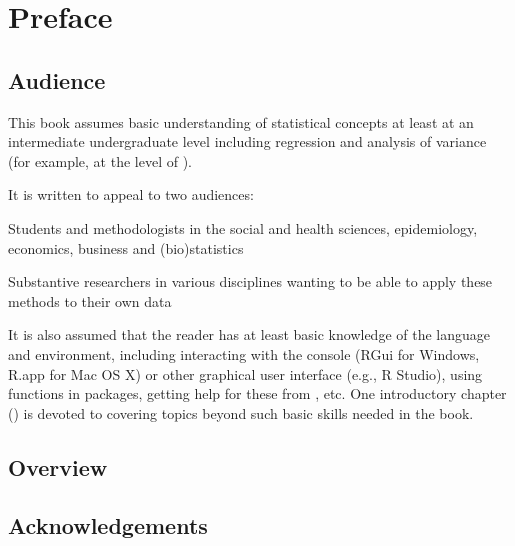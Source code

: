 \chapter{Preface}



\section*{Audience}
This book assumes basic understanding of statistical concepts at least at an
intermediate undergraduate level including regression and analysis of variance
(for example, at the level of \citet{Neter-etal:90,MendenhallSincich:2003}).

It is written to appeal to two audiences:
\begin{itemize*}
  \item Students and methodologists in the social and health sciences, epidemiology,
    economics, business
	and (bio)statistics
	\item Substantive researchers in various disciplines wanting to be able to
	apply these methods to their own data
\end{itemize*}

It is also assumed that the reader has at least basic knowledge of the \R language and
environment, including interacting with the \R console (RGui for Windows, R.app for Mac OS X)
or other graphical user interface (e.g., R Studio), using \R functions in packages,
getting help for these from \R, etc.  One introductory chapter () is devoted
to covering topics beyond such basic skills needed in the book.

\section*{Overview}

\section*{Acknowledgements}


